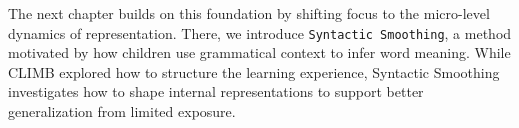 The next chapter builds on this foundation by shifting focus to the micro-level dynamics of representation. There, we introduce \texttt{Syntactic Smoothing}, a method motivated by how children use grammatical context to infer word meaning. While CLIMB explored how to structure the learning experience, Syntactic Smoothing investigates how to shape internal representations to support better generalization from limited exposure.




